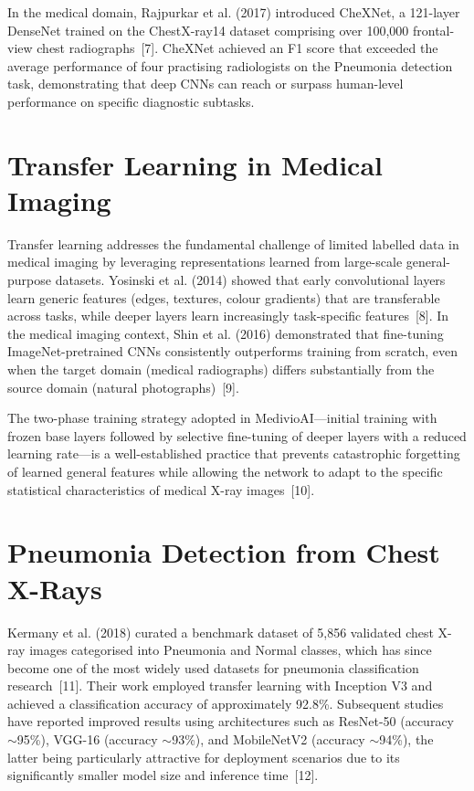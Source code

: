 \documentclass[12pt, a4paper, oneside]{report}
\begin{document}
In the medical domain, Rajpurkar et al. (2017) introduced CheXNet, a 121-layer DenseNet trained on the ChestX-ray14 dataset comprising over 100{,}000 frontal-view chest radiographs~[7]. CheXNet achieved an F1 score that exceeded the average performance of four practising radiologists on the Pneumonia detection task, demonstrating that deep CNNs can reach or surpass human-level performance on specific diagnostic subtasks.

\section{Transfer Learning in Medical Imaging}
\label{sec:transfer_learning}

Transfer learning addresses the fundamental challenge of limited labelled data in medical imaging by leveraging representations learned from large-scale general-purpose datasets. Yosinski et al. (2014) showed that early convolutional layers learn generic features (edges, textures, colour gradients) that are transferable across tasks, while deeper layers learn increasingly task-specific features~[8]. In the medical imaging context, Shin et al. (2016) demonstrated that fine-tuning ImageNet-pretrained CNNs consistently outperforms training from scratch, even when the target domain (medical radiographs) differs substantially from the source domain (natural photographs)~[9].

The two-phase training strategy adopted in MedivioAI---initial training with frozen base layers followed by selective fine-tuning of deeper layers with a reduced learning rate---is a well-established practice that prevents catastrophic forgetting of learned general features while allowing the network to adapt to the specific statistical characteristics of medical X-ray images~[10].

\section{Pneumonia Detection from Chest X-Rays}
\label{sec:pneumonia_literature}

Kermany et al. (2018) curated a benchmark dataset of 5{,}856 validated chest X-ray images categorised into Pneumonia and Normal classes, which has since become one of the most widely used datasets for pneumonia classification research~[11]. Their work employed transfer learning with Inception V3 and achieved a classification accuracy of approximately 92.8\%. Subsequent studies have reported improved results using architectures such as ResNet-50 (accuracy $\sim$95\%), VGG-16 (accuracy $\sim$93\%), and MobileNetV2 (accuracy $\sim$94\%), the latter being particularly attractive for deployment scenarios due to its significantly smaller model size and inference time~[12].
\end{document}
